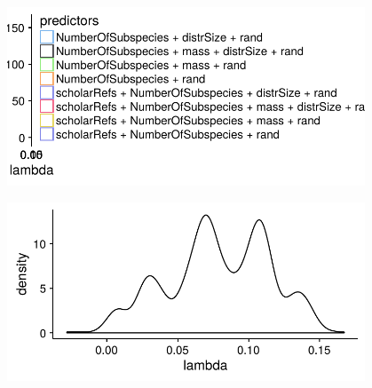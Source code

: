 \begin{knitrout}\footnotesize
{}\color{fgcolor}

{\centering \includegraphics[width=0.8\textwidth]{figure/analyseModelSelect-1} 

}




{\centering \includegraphics[width=0.8\textwidth]{figure/analyseModelSelect-2} 

}



\end{knitrout}












\clearpage


















\clearpage










